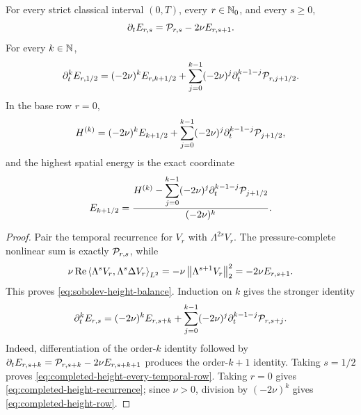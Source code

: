 \begin{proposition}
\label{prop:completed-height-recurrence}
For every strict classical interval \((0,T)\), every \(r\in\mathbb N_0\), and
every \(s\ge0\),
\begin{equation}
 \partial_tE_{r,s}=\mathcal P_{r,s}-2\nu E_{r,s+1}.
 \label{eq:sobolev-height-balance}
\end{equation}
For every \(k\in\mathbb N\),
\begin{equation}
 \partial_t^kE_{r,1/2}
 =(-2\nu)^kE_{r,k+1/2}
 +\sum_{j=0}^{k-1}(-2\nu)^j
   \partial_t^{k-1-j}\mathcal P_{r,j+1/2}.
 \label{eq:completed-height-every-temporal-row}
\end{equation}
In the base row \(r=0\),
\begin{equation}
 H^{(k)}
 =(-2\nu)^kE_{k+1/2}
 +\sum_{j=0}^{k-1}(-2\nu)^j
   \partial_t^{k-1-j}\mathcal P_{j+1/2},
 \label{eq:completed-height-recurrence}
\end{equation}
and the highest spatial energy is the exact coordinate
\begin{equation}
 E_{k+1/2}
 =\frac{H^{(k)}-
   \displaystyle\sum_{j=0}^{k-1}(-2\nu)^j
   \partial_t^{k-1-j}\mathcal P_{j+1/2}}
 {(-2\nu)^k}.
 \label{eq:completed-height-row}
\end{equation}
\end{proposition}

\begin{proof}
Pair the temporal recurrence for \(V_r\) with \(\Lambda^{2s}V_r\).
The pressure-complete nonlinear sum is exactly \(\mathcal P_{r,s}\), while
\[
 \nu\operatorname{Re}\left\langle \Lambda^sV_r,\Lambda^s\Delta V_r\right\rangle_{L^2}
 =-\nu\left\lVert \Lambda^{s+1}V_r\right\rVert_2^2=-2\nu E_{r,s+1}.
\]
This proves \eqref{eq:sobolev-height-balance}.  Induction on \(k\) gives
the stronger identity
\begin{equation}
 \partial_t^kE_{r,s}
 =(-2\nu)^kE_{r,s+k}
 +\sum_{j=0}^{k-1}(-2\nu)^j
   \partial_t^{k-1-j}\mathcal P_{r,s+j}.
 \label{eq:all-height-recurrence}
\end{equation}
Indeed, differentiation of the order-\(k\) identity followed by
\(\partial_tE_{r,s+k}=\mathcal P_{r,s+k}-2\nu E_{r,s+k+1}\) produces the
order-\(k+1\) identity.  Taking \(s=1/2\) proves
\eqref{eq:completed-height-every-temporal-row}.  Taking \(r=0\) gives
\eqref{eq:completed-height-recurrence}; since \(\nu>0\), division by
\((-2\nu)^k\) gives \eqref{eq:completed-height-row}.
\end{proof}

